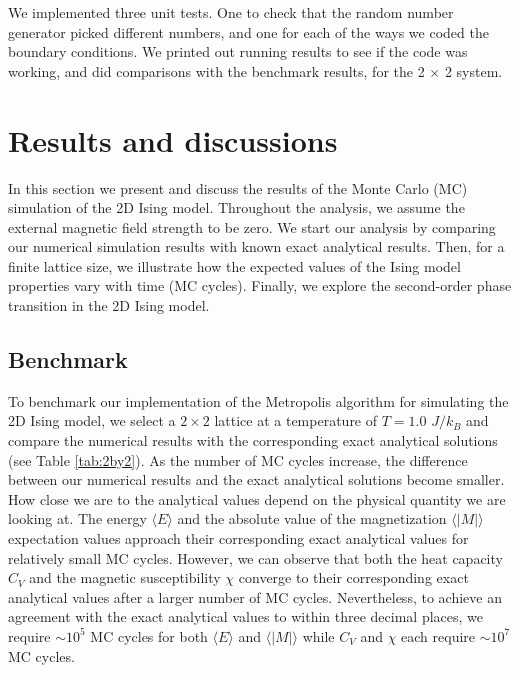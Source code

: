 \documentclass[a4paper]{article}
\begin{document}
We implemented three unit tests. One to check that the random number generator picked different numbers, and one for each of the ways we coded the boundary conditions. We printed out running results to see if the code was working, and did comparisons with the benchmark results, for the 2 $\times$ 2 system. %



\section{Results and discussions}
In this section we present and discuss the results of the Monte Carlo (MC) simulation of the 2D Ising model. Throughout the analysis, we assume the external magnetic field strength to be zero. We start our analysis by comparing our numerical simulation results with known exact analytical results. Then, for a finite lattice size, we illustrate how the expected values of the Ising model properties vary with time (MC cycles). Finally, we explore the second-order phase transition in the 2D Ising model.

\subsection{Benchmark}
To benchmark our implementation of the Metropolis algorithm for simulating the 2D Ising model, we select a $2\times2$ lattice at a temperature of $T=1.0$ $J/k_B$ and compare the numerical results with the corresponding exact analytical solutions (see Table \ref{tab:2by2}). As the number of MC cycles increase, the difference between our numerical results and the exact analytical solutions become smaller. How close we are to the analytical values depend on the physical quantity we are looking at. The energy $\langle E \rangle$ and the absolute value of the magnetization $\langle |M| \rangle$ expectation values approach their corresponding exact analytical values for relatively small MC cycles. However, we can observe that both the heat capacity $C_V$ and the magnetic susceptibility $\chi$ converge to their corresponding exact analytical values after a larger number of MC cycles. Nevertheless, to achieve an agreement with the exact analytical values to within three decimal places, we require $\sim 10^5$ MC cycles for both $\langle E \rangle$ and $\langle |M| \rangle$ while $C_V$ and $\chi$ each require $\sim 10^7$ MC cycles.
\end{document}
